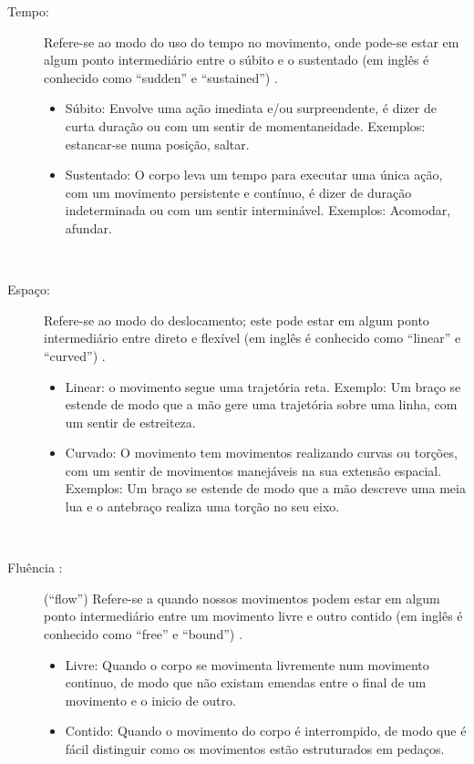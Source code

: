 \begin{description}
\item[Tempo:] Refere-se ao modo do uso do tempo no movimento,
onde pode-se estar em algum ponto intermediário entre o súbito e o sustentado 
(em inglês é conhecido como    ``sudden'' e ``sustained'') 
\cite[pp. 143]{laban1987dominio} \cite[pp. 5]{carline2011lesson} \cite[pp. 28]{elementosdanca2017}.
\begin{itemize}
\item Súbito: Envolve uma ação imediata e/ou surpreendente, é dizer de curta duração
ou com um sentir de momentaneidade. Exemplos: estancar-se numa posição, saltar.
\item Sustentado: O corpo leva um tempo para executar uma única ação, 
com um movimento persistente e contínuo, é dizer de duração indeterminada ou com um sentir interminável.  
Exemplos: Acomodar, afundar.
\end{itemize}~
\end{description}

\begin{description}
\item[Espaço:] Refere-se ao modo do deslocamento;
este pode estar em algum ponto intermediário entre  direto  e  flexível 
(em inglês é conhecido como  ``linear'' e ``curved'') 
\cite[pp. 143]{laban1987dominio} \cite[pp. 6]{carline2011lesson} \cite[pp. 28]{elementosdanca2017}.
\begin{itemize}
\item Linear: o movimento segue uma trajetória reta. Exemplo:
Um braço se estende de modo que a mão gere uma trajetória sobre uma linha,
com um sentir de estreiteza.
\item Curvado: O movimento tem movimentos realizando curvas ou torções,
com um sentir de movimentos manejáveis na sua extensão espacial. 
Exemplos: Um braço se estende de modo que a mão descreve uma meia lua e o antebraço realiza uma torção no seu eixo.
\end{itemize}~
\item[Fluência :] (``flow'') Refere-se a quando nossos movimentos podem 
estar em algum ponto intermediário entre um movimento livre  e outro contido 
(em inglês é conhecido como   ``free'' e ``bound'')
\cite[pp. 140-143]{laban1987dominio} \cite[pp. 6]{carline2011lesson} \cite[pp. 27]{elementosdanca2017}.
\begin{itemize}
\item Livre: Quando o corpo se movimenta livremente num movimento continuo,
de modo que não existam emendas entre o final de um movimento e o inicio de outro.
\item Contido: Quando o movimento do corpo é interrompido,
de modo que é fácil distinguir como os movimentos estão estruturados em pedaços.
\end{itemize}~
\end{description}

